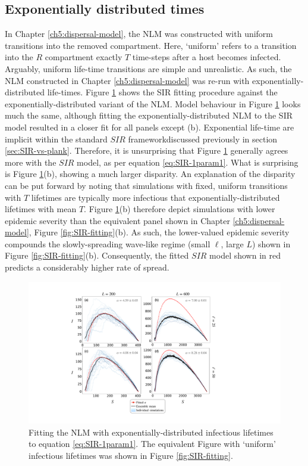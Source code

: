 \subsection{Exponentially distributed times}

\label{a:exponentially-distributed-lt}
In Chapter \ref{ch5:dispersal-model}, the NLM was constructed with uniform transitions into the removed compartment.
Here, `uniform' refers to a transition into the $R$ compartment exactly $T$ time-steps after a host becomes infected.
Arguably, uniform life-time transitions are simple and unrealistic.
As such, the NLM constructed in Chapter \ref{ch5:dispersal-model} was re-run with exponentially-distributed life-times. 
Figure \ref{fig:SIR-fitting-expontial} shows the SIR fitting procedure against the exponentially-distributed variant of the NLM. 
Model behaviour in Figure \ref{fig:SIR-fitting-expontial} looks much the same, although fitting the exponentially-distributed NLM to the SIR model resulted in a closer fit for all panels except (b). 
Exponential life-time are implicit within the standard $SIR$ framework\textemdash discussed previously in section \ref{sec:SIR-vs-plank}.
Therefore, it is unsurprising that Figure \ref{fig:SIR-fitting-expontial} generally agrees more with the $SIR$ model, as per equation \ref{eq:SIR-1param1}.
What is surprising is Figure \ref{fig:SIR-fitting-expontial}(b), showing a much larger disparity. 
An explanation of the disparity can be put forward by noting that simulations with fixed, uniform transitions with $T$ lifetimes are typically
more infectious that exponentially-distributed lifetimes with mean $T$. Figure \ref{fig:SIR-fitting-expontial}(b) therefore depict simulations
with lower epidemic severity than the equivalent panel shown in Chapter \ref{ch5:dispersal-model}, Figure \ref{fig:SIR-fitting}(b).
As such, the lower-valued epidemic severity compounds the slowly-spreading wave-like regime (small $\ell$, large $L$) shown in Figure \ref{fig:SIR-fitting}(b).
Consequently, the fitted $SIR$ model shown in red predicts a considerably higher rate of spread.

\begin{figure}
    \centering
    \includegraphics[scale=0.4]{chapter5/figures/fig2-sir-fitting-exp.pdf}
    \caption{Fitting the NLM with exponentially-distributed infectious lifetimes to equation \ref{eq:SIR-1param1}. 
    The equivalent Figure with `uniform' infectious lifetimes was shown in Figure \ref{fig:SIR-fitting}.
    }
    \label{fig:SIR-fitting-expontial}
\end{figure}

